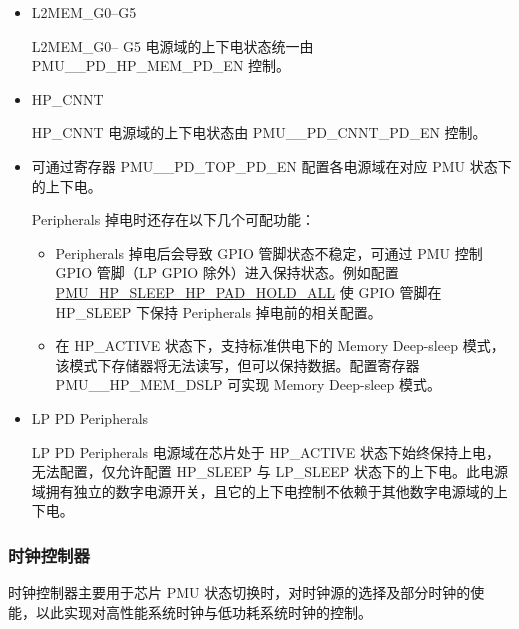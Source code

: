 \documentclass[main\_\_CN.tex]{subfiles}
\begin{document}
\begin{itemize}
\item L2MEM\_G0–G5

L2MEM\_G0– G5 电源域的上下电状态统一由 PMU\_\_PD\_HP\_MEM\_PD\_EN 控制。

\item HP\_CNNT

HP\_CNNT 电源域的上下电状态由 PMU\_\_PD\_CNNT\_PD\_EN 控制。


\item {}

可通过寄存器 PMU\_\_PD\_TOP\_PD\_EN 配置各电源域在对应 PMU 状态下的上下电。

Peripherals 掉电时还存在以下几个可配功能：
    \begin{itemize}
    \item Peripherals 掉电后会导致 GPIO 管脚状态不稳定，可通过 PMU 控制 GPIO 管脚（LP GPIO 除外）进入保持状态。例如配置 \hyperref[fielddesc:PMUHPSLEEPHPPADHOLDALL]{PMU\_HP\_SLEEP\_HP\_PAD\_HOLD\_ALL} 使 GPIO 管脚在 HP\_SLEEP 下保持 Peripherals 掉电前的相关配置。

    \item 在 HP\_ACTIVE 状态下，支持标准供电下的 Memory Deep-sleep 模式，该模式下存储器将无法读写，但可以保持数据。配置寄存器 PMU\_\_HP\_MEM\_DSLP 可实现 Memory Deep-sleep 模式。
    \end{itemize}

\item LP PD Peripherals

LP PD Peripherals 电源域在芯片处于 HP\_ACTIVE 状态下始终保持上电，无法配置，仅允许配置 HP\_SLEEP 与 LP\_SLEEP 状态下的上下电。此电源域拥有独立的数字电源开关，且它的上下电控制不依赖于其他数字电源域的上下电。

\end{itemize}

\subsubsection{时钟控制器}

时钟控制器主要用于芯片 PMU 状态切换时，对时钟源的选择及部分时钟的使能，以此实现对高性能系统时钟与低功耗系统时钟的控制。
\end{document}
